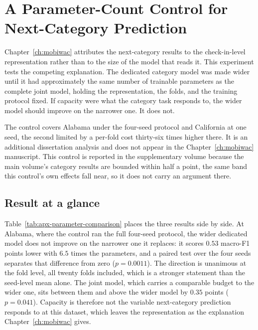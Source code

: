 \chapter{A Parameter-Count Control for Next-Category Prediction}
\label{apx:parameter-count-control}

Chapter~\ref{ch:mobiwac} attributes the next-category results to the check-in-level
representation rather than to the size of the model that reads it. This experiment tests the
competing explanation. The dedicated category model was made wider until it had approximately the
same number of trainable parameters as the complete joint model, holding the representation, the
folds, and the training protocol fixed. If capacity were what the category task responds to, the
wider model should improve on the narrower one. It does not.

The control covers Alabama under the four-seed protocol and California at one seed, the second
limited by a per-fold cost thirty-six times higher there. It is an additional dissertation analysis
and does not appear in the Chapter~\ref{ch:mobiwac} manuscript.
This control is reported in the supplementary volume because the main volume's category results are
bounded within half a point, the same band this control's own effects fall near, so it does not
carry an argument there.

\section{Result at a glance}
\label{sec:apx-parameter-summary}

Table~\ref{tab:apx-parameter-comparison} places the three results side by side. At Alabama, where
the control ran the full four-seed protocol, the wider dedicated model does not improve on the
narrower one it replaces: it scores $0.53$ macro-F1 points lower with $6.5$ times the parameters,
and a paired test over the four seeds separates that difference from zero ($p = 0.0011$). The
direction is unanimous at the fold level, all twenty folds included, which is a stronger statement
than the seed-level mean alone. The joint
model, which carries a comparable budget to the wider one, sits between them and above the wider
model by $0.35$ points ($p = 0.041$). Capacity is therefore not the variable next-category
prediction responds to at this dataset, which leaves the representation as the explanation
Chapter~\ref{ch:mobiwac} gives.

